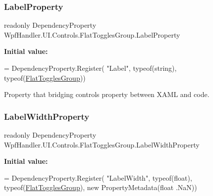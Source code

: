 \subsubsection{\texorpdfstring{Label\+Property}{LabelProperty}}
{\footnotesize\ttfamily readonly Dependency\+Property Wpf\+Handler.\+U\+I.\+Controls.\+Flat\+Toggles\+Group.\+Label\+Property\hspace{0.3cm}{\ttfamily [static]}}

{\bfseries Initial value\+:}
\begin{DoxyCode}
= DependencyProperty.Register(
          \textcolor{stringliteral}{"Label"}, typeof(\textcolor{keywordtype}{string}), typeof(\mbox{\hyperlink{class_wpf_handler_1_1_u_i_1_1_controls_1_1_flat_toggles_group_a026f873b2f214e35ee3f3ad5715e1bad}{FlatTogglesGroup}}))
\end{DoxyCode}


Property that bridging control\textquotesingle{}s property between X\+A\+ML and code. 

\mbox{\label{class_wpf_handler_1_1_u_i_1_1_controls_1_1_flat_toggles_group_acd4cc98db2da7479ac81dd03ceaadcae}} 
\subsubsection{\texorpdfstring{Label\+Width\+Property}{LabelWidthProperty}}
{\footnotesize\ttfamily readonly Dependency\+Property Wpf\+Handler.\+U\+I.\+Controls.\+Flat\+Toggles\+Group.\+Label\+Width\+Property\hspace{0.3cm}{\ttfamily [static]}}

{\bfseries Initial value\+:}
\begin{DoxyCode}
= DependencyProperty.Register(
          \textcolor{stringliteral}{"LabelWidth"}, typeof(\textcolor{keywordtype}{float}), typeof(\mbox{\hyperlink{class_wpf_handler_1_1_u_i_1_1_controls_1_1_flat_toggles_group_a026f873b2f214e35ee3f3ad5715e1bad}{FlatTogglesGroup}}), \textcolor{keyword}{new} PropertyMetadata(\textcolor{keywordtype}{float}
      .NaN))
\end{DoxyCode}


